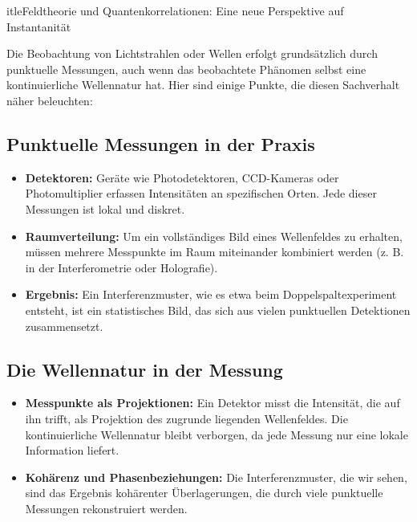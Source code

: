 \documentclass[12pt,a4paper]{article}
\begin{document}
	
	
		itle{Feldtheorie und Quantenkorrelationen: Eine neue Perspektive auf Instantanität}
	
	
	\maketitle
	
	Die Beobachtung von Lichtstrahlen oder Wellen erfolgt grundsätzlich durch punktuelle Messungen, auch wenn das beobachtete Phänomen selbst eine kontinuierliche Wellennatur hat. Hier sind einige Punkte, die diesen Sachverhalt näher beleuchten:
	
	\subsection{Punktuelle Messungen in der Praxis}
	\begin{itemize}
		\item \textbf{Detektoren:} Geräte wie Photodetektoren, CCD-Kameras oder Photomultiplier erfassen Intensitäten an spezifischen Orten. Jede dieser Messungen ist lokal und diskret.
		\item \textbf{Raumverteilung:} Um ein vollständiges Bild eines Wellenfeldes zu erhalten, müssen mehrere Messpunkte im Raum miteinander kombiniert werden (z. B. in der Interferometrie oder Holografie).
		\item \textbf{Ergebnis:} Ein Interferenzmuster, wie es etwa beim Doppelspaltexperiment entsteht, ist ein statistisches Bild, das sich aus vielen punktuellen Detektionen zusammensetzt.
	\end{itemize}
	
	\subsection{Die Wellennatur in der Messung}
	\begin{itemize}
		\item \textbf{Messpunkte als Projektionen:} Ein Detektor misst die Intensität, die auf ihn trifft, als Projektion des zugrunde liegenden Wellenfeldes. Die kontinuierliche Wellennatur bleibt verborgen, da jede Messung nur eine lokale Information liefert.
		\item \textbf{Kohärenz und Phasenbeziehungen:} Die Interferenzmuster, die wir sehen, sind das Ergebnis kohärenter Überlagerungen, die durch viele punktuelle Messungen rekonstruiert werden.
	\end{itemize}
	
\end{document}

